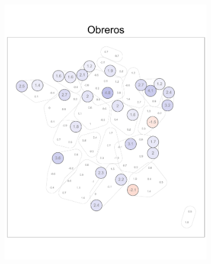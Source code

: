 \begin{figure}
\begin{subfigure}{0.235\textwidth}
	\includegraphics[width = \textwidth]{Figs/Efectos/Dorling_Efectos_CSP6_Modelo_H}
	\end{subfigure}
	~
	\begin{subfigure}{0.235\textwidth}

\end{subfigure}
\end{figure}
